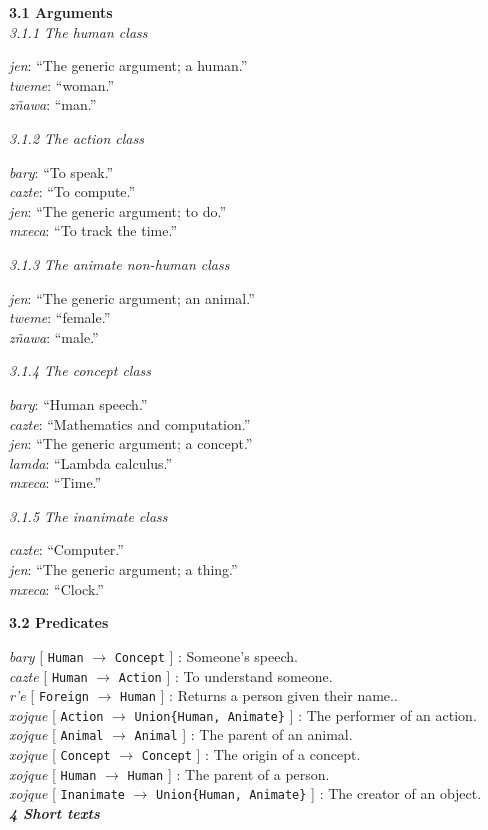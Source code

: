 \documentclass{article}[10pt]
\newcommand{\define}[4]{\emph{#1} [ \texttt{#2} $\rightarrow$ \texttt{#3} ] : #4. \\}
\newcommand{\defarg}[2]{\emph{#1}: ``#2.''\\}
\begin{document}
{\bf 3.1 Arguments}\\

\emph{3.1.1 The human class}
\begin{multicols}{3}
\noindent
\defarg{jen}{The generic argument; a human}
\defarg{tweme}{woman}
\defarg{z\~{n}awa}{man}
\end{multicols}

\emph{3.1.2 The action class}
\begin{multicols}{3}
\noindent
\defarg{bary}{To speak}
\defarg{cazte}{To compute}
\defarg{jen}{The generic argument; to do}
\defarg{mxeca}{To track the time}
\end{multicols}

\emph{3.1.3 The animate non-human class}
\begin{multicols}{3}
\noindent
\defarg{jen}{The generic argument; an animal}
\defarg{tweme}{female}
\defarg{z\~{n}awa}{male}
\end{multicols}

\emph{3.1.4 The concept class}
\begin{multicols}{3}
\noindent
\defarg{bary}{Human speech}
\defarg{cazte}{Mathematics and computation}
\defarg{jen}{The generic argument; a concept}
\defarg{lamda}{Lambda calculus}
\defarg{mxeca}{Time}
\end{multicols}

\emph{3.1.5 The inanimate class}
\begin{multicols}{3}
\noindent
\defarg{cazte}{Computer}
\defarg{jen}{The generic argument; a thing}
\defarg{mxeca}{Clock}
\end{multicols}

{\bf 3.2 Predicates}

\noindent
\define{bary}{Human}{Concept}{Someone's speech}
\define{cazte}{Human}{Action}{To understand someone}
\define{r'e}{Foreign}{Human}{Returns a person given their name.}
\define{xojque}{Action}{Union\{Human, Animate\}}{The performer of an action}
\define{xojque}{Animal}{Animal}{The parent of an animal}
\define{xojque}{Concept}{Concept}{The origin of a concept}
\define{xojque}{Human}{Human}{The parent of a person}
\define{xojque}{Inanimate}{Union\{Human, Animate\}}{The creator of an object}

\clearpage
{\bf \emph{4 Short texts}}\\
\end{document}
